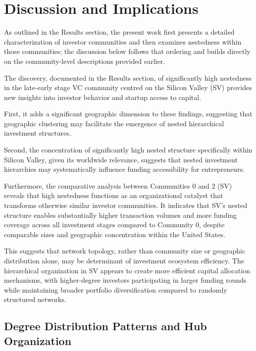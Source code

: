 \section{Discussion and Implications}

As outlined in the Results section, the present work first presents a detailed characterization of investor communities and then examines nestedness within those communities; the discussion below follows that ordering and builds directly on the community-level descriptions provided earlier.

The discovery, documented in the Results section, of significantly high nestedness in the late-early stage VC community centred on the Silicon Valley (SV) provides new insights into investor behavior and startup access to capital. 

First, it adds a significant geographic dimension to these findings, suggesting that geographic clustering may facilitate the emergence of nested hierarchical investment structures.

Second, the concentration of significantly high nested structure specifically within Silicon Valley, given its worldwide relevance, suggests that nested investment hierarchies may systematically influence funding accessibility for entrepreneurs. 

Furthermore, the comparative analysis between Communities 0 and 2 (SV) reveals that high nestedness functions as an organizational catalyst that transforms otherwise similar investor communities. It indicates that SV's nested structure enables substantially higher transaction volumes and more funding coverage across all investment stages compared to Community 0, despite comparable sizes and geographic concentration within the United States.

This suggests that network topology, rather than community size or geographic distribution alone, may be determinant of investment ecosystem efficiency. The hierarchical organization in SV appears to create more efficient capital allocation mechanisms, with higher-degree investors participating in larger funding rounds while maintaining broader portfolio diversification compared to randomly structured networks.

\subsection{Degree Distribution Patterns and Hub Organization}

